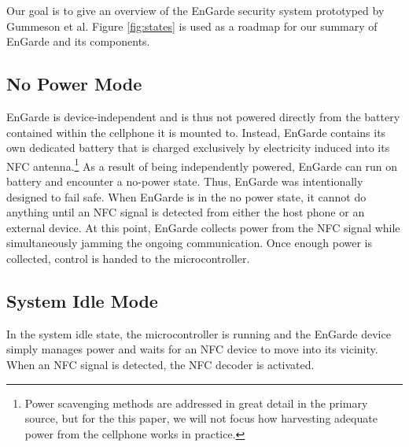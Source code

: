 \documentclass{sig-alternate}
\begin{document}
Our goal is to give an overview of the EnGarde security system prototyped by Gummeson et al. Figure \ref{fig:states} is used as a roadmap for our summary of EnGarde and its components.

\subsection{No Power Mode}

EnGarde is device-independent and is thus not powered directly from the battery contained within the cellphone it is mounted to. Instead, EnGarde contains its own dedicated battery that is charged exclusively by electricity induced into its NFC antenna.\footnote{Power scavenging methods are addressed in great detail in the primary source, but for the this paper, we will not focus how harvesting adequate power from the cellphone works in practice.} 
As a result of being independently powered, EnGarde can run on battery and encounter a no-power state. Thus, EnGarde was intentionally designed to fail safe. When EnGarde is in the no power state, it cannot do anything until an NFC signal is detected from either the host phone or an external device. At this point, EnGarde collects power from the NFC signal while simultaneously jamming the ongoing communication. Once enough power is collected, control is handed to the microcontroller.

\subsection{System Idle Mode}
In the system idle state, the microcontroller is running and the EnGarde device simply manages power and waits for an NFC device to move into its vicinity. When an NFC signal is detected, the NFC decoder is activated.
\end{document}

